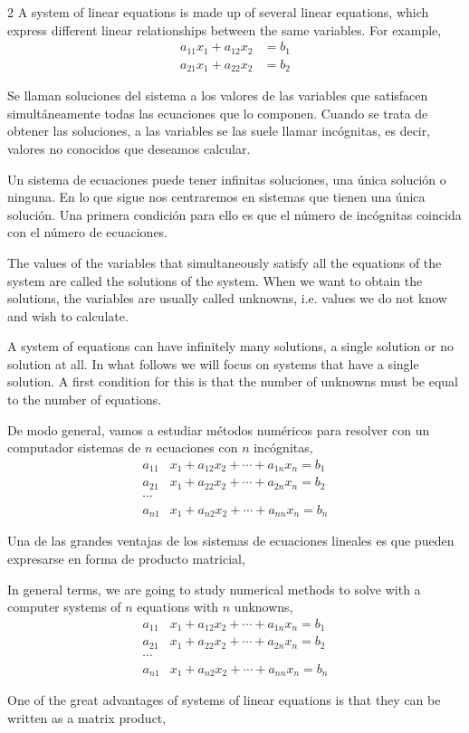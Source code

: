 \begin{paracol}{2}
A system of linear equations is made up of several linear equations, which express different linear relationships between the same variables. For example,
\begin{align*}
a_{11}x_1+a_{12}x_2&=b_1\\
a_{21}x_1+a_{22}x_2&=b_2
\end{align*}

\switchcolumn

Se llaman soluciones del sistema a los valores de las variables que satisfacen simultáneamente todas las ecuaciones que lo componen. Cuando se trata de obtener las soluciones, a las variables se las suele llamar incógnitas, es decir, valores no conocidos que deseamos calcular.

Un sistema de ecuaciones puede tener infinitas soluciones, una única solución o ninguna. En lo que sigue nos centraremos en sistemas que tienen una única solución. Una primera condición para ello es que el número de incógnitas coincida con el número de ecuaciones.

\switchcolumn

The values of the variables that simultaneously satisfy all the equations of the system are called the solutions of the system. When we want to obtain the solutions, the variables are usually called unknowns, i.e. values we do not know and wish to calculate.

A system of equations can have infinitely many solutions, a single solution or no solution at all. In what follows we will focus on systems that have a single solution. A first condition for this is that the number of unknowns must be equal to the number of equations.

\switchcolumn

De modo general, vamos a estudiar métodos numéricos para resolver con un computador sistemas de $n$ ecuaciones con $n$ incógnitas,
\begin{align*}
a_{11}&x_1+a_{12}x_2+\cdots +a_{1n}x_n=b_1\\
a_{21}&x_1+a_{22}x_2+\cdots +a_{2n}x_n=b_2\\
\cdots & \\
a_{n1}&x_1+a_{n2}x_2+\cdots +a_{nn}x_n=b_n
\end{align*}

Una de las grandes ventajas de los sistemas de ecuaciones lineales es que pueden expresarse en forma de producto matricial,

\switchcolumn

In general terms, we are going to study numerical methods to solve with a computer systems of $n$ equations with $n$ unknowns,
\begin{align*}
a_{11}&x_1+a_{12}x_2+\cdots +a_{1n}x_n=b_1\\
a_{21}&x_1+a_{22}x_2+\cdots +a_{2n}x_n=b_2\\
\cdots & \\
a_{n1}&x_1+a_{n2}x_2+\cdots +a_{nn}x_n=b_n
\end{align*}

One of the great advantages of systems of linear equations is that they can be written as a matrix product,

\end{paracol}

